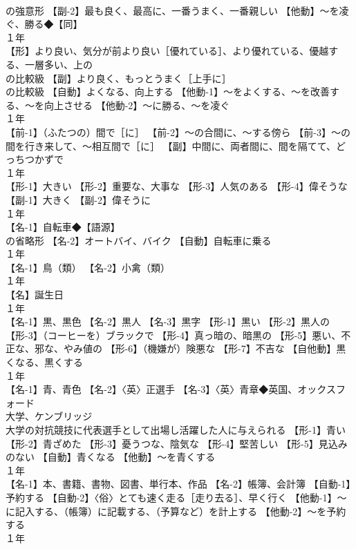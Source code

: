 \documentclass[8pt]{extreport}
\begin{document}
\begin{CJK}{UTF8}{min}
\\	の強意形 【副-2】最も良く、最高に、一番うまく、一番親しい 【他動】～を凌ぐ、勝る◆【同】
\\	１年	
\\	【形】より良い、気分が前より良い［優れている］、より優れている、優越する、一層多い、上の
\\	の比較級 【副】より良く、もっとうまく［上手に］
\\	の比較級 【自動】よくなる、向上する 【他動-1】～をよくする、～を改善する、～を向上させる 【他動-2】～に勝る、～を凌ぐ
\\	１年	
\\	【前-1】（ふたつの）間で［に］ 【前-2】～の合間に、～する傍ら 【前-3】～の間を行き来して、～相互間で［に］ 【副】中間に、両者間に、間を隔てて、どっちつかずで
\\	１年	
\\	【形-1】大きい 【形-2】重要な、大事な 【形-3】人気のある 【形-4】偉そうな 【副-1】大きく 【副-2】偉そうに
\\	１年	
\\	【名-1】自転車◆【語源】
\\	の省略形 【名-2】オートバイ、バイク 【自動】自転車に乗る
\\	１年	
\\	【名-1】鳥（類） 【名-2】小禽（類）
\\	１年	
\\	【名】誕生日
\\	１年	
\\	【名-1】黒、黒色 【名-2】黒人 【名-3】黒字 【形-1】黒い 【形-2】黒人の 【形-3】（コーヒーを）ブラックで 【形-4】真っ暗の、暗黒の 【形-5】悪い、不正な、邪な、やみ値の 【形-6】（機嫌が）険悪な 【形-7】不吉な 【自他動】黒くなる、黒くする
\\	１年	
\\	【名-1】青、青色 【名-2】〈英〉正選手 【名-3】〈英〉青章◆英国、オックスフォード
\\	大学、ケンブリッジ
\\	大学の対抗競技に代表選手として出場し活躍した人に与えられる 【形-1】青い 【形-2】青ざめた 【形-3】憂うつな、陰気な 【形-4】堅苦しい 【形-5】見込みのない 【自動】青くなる 【他動】～を青くする
\\	１年	
\\	【名-1】本、書籍、書物、図書、単行本、作品 【名-2】帳簿、会計簿 【自動-1】予約する 【自動-2】〈俗〉とても速く走る［走り去る］、早く行く 【他動-1】～に記入する、（帳簿）に記載する、（予算など）を計上する 【他動-2】～を予約する
\\	１年	

\end{CJK}
\end{document}
